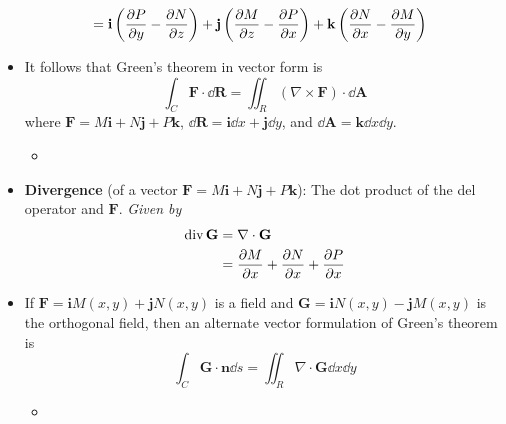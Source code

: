 \documentclass[../main.tex]{subfiles}
\begin{document}
\begin{itemize}
\begin{align*}
        &= \mathbf{i}\left( \pdv{P}{y}-\pdv{N}{z} \right)+\mathbf{j}\left( \pdv{M}{z}-\pdv{P}{x} \right)+\mathbf{k}\left( \pdv{N}{x}-\pdv{M}{y} \right)
    \end{align*}
    \item It follows that Green's theorem in vector form is
    \begin{equation*}
        \int_C\mathbf{F}\cdot\dd{\mathbf{R}} = \iint_R(\nabla\times\mathbf{F})\cdot\dd{\mathbf{A}}
    \end{equation*}
    where $\mathbf{F}=M\mathbf{i}+N\mathbf{j}+P\mathbf{k}$, $\dd{\mathbf{R}}=\mathbf{i}\dd{x}+\mathbf{j}\dd{y}$, and $\dd{\mathbf{A}}=\mathbf{k}\dd{x}\dd{y}$.
    \begin{itemize}
        \item {}
    \end{itemize}
    \item \textbf{Divergence} (of a vector $\mathbf{F}=M\mathbf{i}+N\mathbf{j}+P\mathbf{k}$): The dot product of the del operator and $\mathbf{F}$. \emph{Given by}
    \begin{align*}
        \text{div}\,\mathbf{G} &= \nabla\cdot\mathbf{G}\\
        &= \pdv{M}{x}+\pdv{N}{x}+\pdv{P}{x}
    \end{align*}
    \item If $\mathbf{F}=\mathbf{i}M(x,y)+\mathbf{j}N(x,y)$ is a field and $\mathbf{G}=\mathbf{i}N(x,y)-\mathbf{j}M(x,y)$ is the orthogonal field, then an alternate vector formulation of Green's theorem is
    \begin{equation*}
        \int_C\mathbf{G}\cdot\mathbf{n}\dd{s} = \iint_R\nabla\cdot\mathbf{G}\dd{x}\dd{y}
    \end{equation*}
    \begin{itemize}
        \item {}
    \end{itemize}
\end{itemize}
\end{document}
